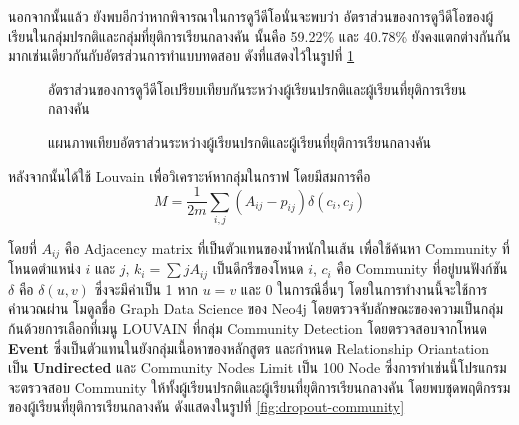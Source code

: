 \documentclass[conference]{IEEEtran}
\def\dropout{ยุติการเรียนกลางคัน}
\begin{document}
    นอกจากนั้นแล้ว ยังพบอีกว่าหากพิจารณาในการดูวีดีโอนั่นจะพบว่า 
    อัตราส่วนของการดูวีดีโอของผู้เรียนในกลุ่มปรกติและกลุ่มที่{\dropout} นั้นคือ 59.22\% และ 40.78\%
    ยังคงแตกต่างกันกันมากเช่นเดียวกันกับอัตรส่วนการทำแบบทดสอบ ดังที่แสดงไว้ในรูปที่ \ref{fig:video-norm-dropout}

    \begin{figure}[ht!]
        \caption{อัตราส่วนของการดูวีดีโอเปรียบเทียบกันระหว่างผู้เรียนปรกติและผู้เรียนที่{\dropout}}
        \label{fig:video-norm-dropout}
    \end{figure}
    
    \begin{figure}[ht!]
        \caption{แผนภาพเทียบอัตราส่วนระหว่างผู้เรียนปรกติและผู้เรียนที่{\dropout}}
        \label{fig:normalvsdropout}
    \end{figure}

    หลังจากนั้นได้ใช้ Louvain เพื่อวิเคราะห์หากลุ่มในกราฟ โดยมีสมการคือ 
    \[
       M = \frac{1}{2m}\sum_{i,j}(A_{ij}-p_{ij})\delta(c_i, c_j)
    \]

    โดยที่ $A_{ij}$ คือ Adjacency matrix ที่เป็นตัวแทนของน้ำหนักในเส้น
    เพื่อใช้ค้นหา Community ที่โหนดตำแหน่ง $i$ และ $j$, $k_i = \sum{j A_{ij}}$ 
    เป็นดีกรีของโหนด $i$, $c_i$ คือ Community ที่อยู่บนฟังก์ชัน $\delta$ คือ 
    $\delta(u, v)$ ซึ่งจะมีค่าเป็น 1 หาก $u = v$ และ 0 ในการณีอื่นๆ โดยในการทำงานนี้จะใช้การคำนวณผ่าน 
    โมดูลชื่อ Graph Data Science ของ Neo4j โดยตรวจจับลักษณะของความเป็นกลุ่มก้นด้วยการเลือกที่เมนู
    LOUVAIN ที่กลุ่ม Community Detection โดยตรวจสอบจากโหนด \textbf{Event} 
    ซึ่งเป็นตัวแทนในยังกลุ่มเนื้อหาของหลักสูตร และกำหนด Relationship Oriantation เป็น \textbf{Undirected}
    และ Community Nodes Limit เป็น 100 Node ซึ่งการทำเช่นนี้โปรแกรมจะตรวจสอบ Community
    ให้ทั้งผู้เรียนปรกติและผู้เรียนที่{\dropout} โดยพบชุดพฤติกรรมของผู้เรียนที่{\dropout} 
    ดังแสดงในรูปที่ \ref{fig:dropout-community}
\end{document}
